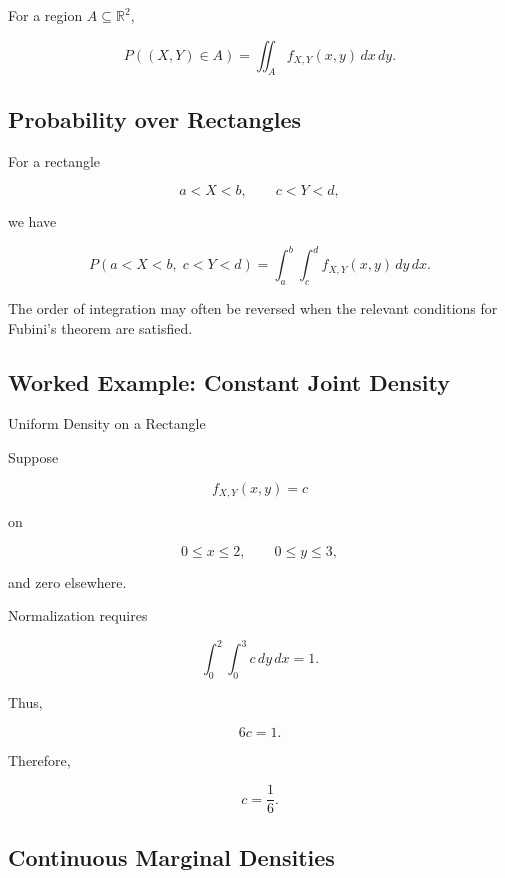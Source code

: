 For a region \(A\subseteq\mathbb{R}^2\),

\[
\boxed{
P((X,Y)\in A)
=
\iint_A
f_{X,Y}(x,y)\,dx\,dy.
}
\]

\subsection{Probability over Rectangles}
\label{subsec:joint-probability-rectangles}

For a rectangle

\[
a<X<b,
\qquad
c<Y<d,
\]

we have

\[
\boxed{
P(a<X<b,\;c<Y<d)
=
\int_a^b
\int_c^d
f_{X,Y}(x,y)\,dy\,dx.
}
\]

The order of integration may often be reversed when the relevant
conditions for Fubini's theorem are satisfied.

\subsection{Worked Example: Constant Joint Density}
\label{subsec:worked-constant-joint-density}

\begin{workedexamplebox}{Uniform Density on a Rectangle}

Suppose

\[
f_{X,Y}(x,y)
=
c
\]

on

\[
0\leq x\leq2,
\qquad
0\leq y\leq3,
\]

and zero elsewhere.

Normalization requires

\[
\int_0^2\int_0^3 c\,dy\,dx
=
1.
\]

Thus,

\[
6c=1.
\]

Therefore,

\begin{answerbox}
\[
\boxed{
c=\frac16.
}
\]
\end{answerbox}

\end{workedexamplebox}

\subsection{Continuous Marginal Densities}
\label{subsec:continuous-marginal-densities}

